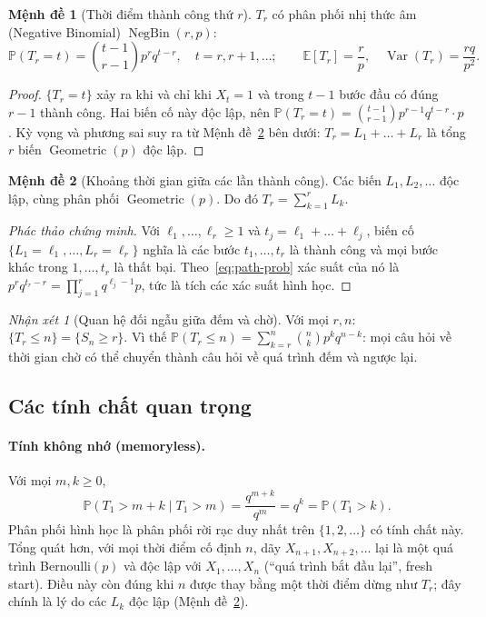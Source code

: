 \documentclass[12pt,a4paper]{article}
\theoremstyle{definition}
\newtheorem{proposition}{Mệnh đề}[section]
\theoremstyle{remark}
\newtheorem*{remark}{Nhận xét}
\newcommand{\Prob}{\mathbb{P}}
\newcommand{\E}{\mathbb{E}}
\newcommand{\Var}{\operatorname{Var}}
\newcommand{\Geo}{\operatorname{Geometric}}
\newcommand{\NB}{\operatorname{NegBin}}
\begin{document}
\begin{proposition}[Thời điểm thành công thứ $r$]\label{prop:negbin}
$T_r$ có phân phối nhị thức âm (Negative Binomial) $\NB(r,p)$:
\begin{equation}\label{eq:negbin}
  \Prob(T_r = t) = \binom{t-1}{r-1} p^r q^{t-r}, \quad t = r, r+1, \dots;\qquad
  \E[T_r] = \frac rp,\quad \Var(T_r) = \frac{rq}{p^2}.
\end{equation}
\end{proposition}
\begin{proof}
$\{T_r = t\}$ xảy ra khi và chỉ khi $X_t = 1$ và trong $t-1$ bước đầu có đúng $r-1$ thành công. Hai biến cố
này độc lập, nên $\Prob(T_r=t) = \binom{t-1}{r-1}p^{r-1}q^{t-r}\cdot p$. Kỳ vọng và phương sai suy ra từ
Mệnh đề~\ref{prop:interarrival} bên dưới: $T_r = L_1 + \dots + L_r$ là tổng $r$ biến $\Geo(p)$ độc lập.
\end{proof}

\begin{proposition}[Khoảng thời gian giữa các lần thành công]\label{prop:interarrival}
Các biến $L_1, L_2, \dots$ độc lập, cùng phân phối $\Geo(p)$. Do đó $T_r = \sum_{k=1}^r L_k$.
\end{proposition}
\begin{proof}[Phác thảo chứng minh]
Với $\ell_1,\dots,\ell_r\ge1$ và $t_j = \ell_1+\dots+\ell_j$, biến cố
$\{L_1=\ell_1,\dots,L_r=\ell_r\}$ nghĩa là các bước $t_1,\dots,t_r$ là thành công và mọi bước khác trong
$1,\dots,t_r$ là thất bại. Theo~\eqref{eq:path-prob} xác suất của nó là
$p^r q^{t_r - r} = \prod_{j=1}^r q^{\ell_j-1}p$, tức là tích các xác suất hình học.
\end{proof}

\begin{remark}[Quan hệ đối ngẫu giữa đếm và chờ]
Với mọi $r,n$: $\{T_r \le n\} = \{S_n \ge r\}$. Vì thế
$\Prob(T_r \le n) = \sum_{k=r}^{n}\binom nk p^k q^{n-k}$: mọi câu hỏi về thời gian chờ có thể chuyển thành câu
hỏi về quá trình đếm và ngược lại.
\end{remark}

\subsection{Các tính chất quan trọng}
\paragraph{Tính không nhớ (memoryless).} Với mọi $m,k\ge0$,
\begin{equation}\label{eq:memoryless}
  \Prob(T_1 > m+k \mid T_1 > m) = \frac{q^{m+k}}{q^m} = q^k = \Prob(T_1 > k).
\end{equation}
Phân phối hình học là phân phối rời rạc duy nhất trên $\{1,2,\dots\}$ có tính chất này. Tổng quát hơn, với
mọi thời điểm cố định $n$, dãy $X_{n+1}, X_{n+2},\dots$ lại là một quá trình Bernoulli$(p)$ và độc lập với
$X_1,\dots,X_n$ (``quá trình bắt đầu lại'', fresh start). Điều này còn đúng khi $n$ được thay bằng một thời
điểm dừng như $T_r$; đây chính là lý do các $L_k$ độc lập (Mệnh đề~\ref{prop:interarrival}).
\end{document}
